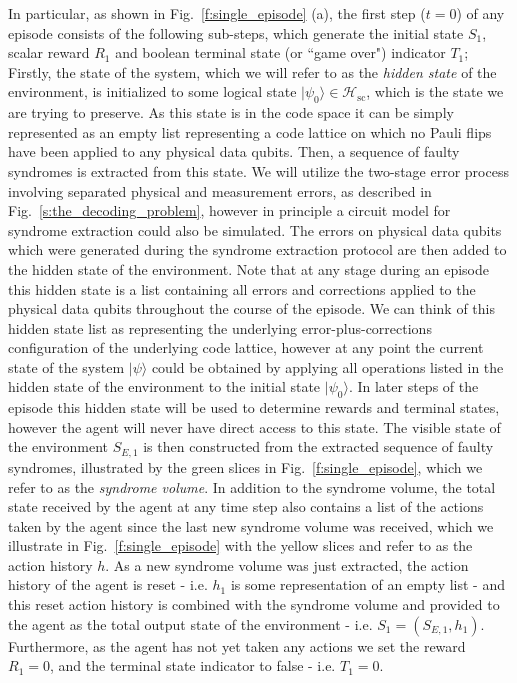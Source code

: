 \documentclass[twocolumn,preprintnumbers,amsmath,amssymb,notitlepage,nofootinbib,longbibliography,superscriptaddress,aps,pra,10pt]{revtex4-1}
\begin{document}
	In particular, as shown in Fig.~\ref{f:single_episode} (a), the first step ($t=0$) of any episode consists of the following sub-steps, which generate the initial state $S_1$, scalar reward $R_1$ and boolean terminal state (or ``game over") indicator $T_1$;
	Firstly, the state of the system, which we will refer to as the \textit{hidden state} of the environment, is initialized to some logical state $|\psi_0\rangle \in \mathcal{H_\mathrm{sc}}$, which is the state we are trying to preserve.
	As this state is in the code space it can be simply represented as an empty list representing a code lattice on which no Pauli flips have been applied to any physical data qubits.
	Then, a sequence of faulty syndromes is extracted from this state.
	We will utilize the two-stage error process involving separated physical and measurement errors, as described in Fig.~\ref{s:the_decoding_problem}, however in principle a circuit model for syndrome extraction could also be simulated.
	The errors on physical data qubits which were generated during the syndrome extraction protocol are then added to the hidden state of the environment.
	Note that at any stage during an episode this hidden state is a list containing all errors and corrections applied to the physical data qubits throughout the course of the episode.
	We can think of this hidden state list as representing the underlying error-plus-corrections configuration of the underlying code lattice, however at any point the current state of the system $|\psi\rangle$ could be obtained by applying all operations listed in the hidden state of the environment to the initial state $|\psi_0\rangle$.
	In later steps of the episode this hidden state will be used to determine rewards and terminal states, however the agent will never have direct access to this state.
	The visible state of the environment $S_{E,1}$ is then constructed from the extracted sequence of faulty syndromes, illustrated by the green slices in Fig.~\ref{f:single_episode}, which we refer to as the \textit {syndrome volume}.
	In addition to the syndrome volume, the total state received by the agent at any time step also contains a list of the actions taken by the agent since the last new syndrome volume was received, which we illustrate in Fig.~\ref{f:single_episode} with the yellow slices and refer to as the action history $h$.
	As a new syndrome volume was just extracted, the action history of the agent is reset - i.e. $h_1$ is some representation of an empty list -  and this reset action history is combined with the syndrome volume and provided to the agent as the total output state of the environment - i.e. $S_1 = (S_{E,1},h_1)$.
	Furthermore, as the agent has not yet taken any actions we set the reward $R_1 =0$, and the terminal state indicator to false - i.e. $T_1=0$.
\end{document}
